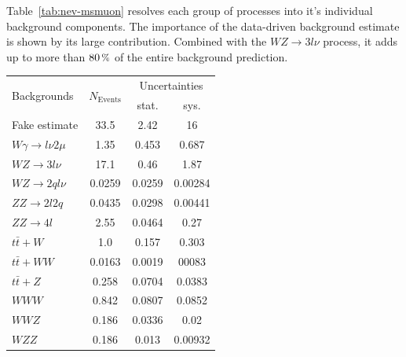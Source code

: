 \noindent Table~\ref{tab:nev-msmuon} resolves each group of processes into it's individual background components. The importance of the data-driven background estimate is shown by its large contribution. Combined with the $WZ \rightarrow 3l \nu$ process, it adds up to more than $80\,\pct$ of the entire background prediction.

\begin{table}[!htb]
  \centering
  \begin{tabular}{|l|c|c|c|}
    \hline
    \multirow{2}{*}{Backgrounds}    & \multirow{2}{*}{$N_{\text{Events}}$} & \multicolumn{2}{|c|}{Uncertainties} \\ \cline{3-4}
                                    &                                      & stat.   & sys.                      \\ \hline \hline
    Fake estimate                   & 33.5                                 & 2.42    & 16                        \\ \hline
    $W\gamma \rightarrow l\nu 2\mu$ & 1.35                                 & 0.453   & 0.687                     \\
    $WZ \rightarrow 3l \nu$         & 17.1                                 & 0.46    & 1.87                      \\
    $WZ \rightarrow 2q l \nu$       & 0.0259                               & 0.0259  & 0.00284                   \\
    $ZZ \rightarrow 2l 2q$          & 0.0435                               & 0.0298  & 0.00441                   \\
    $ZZ \rightarrow 4l$             & 2.55                                 & 0.0464  & 0.27                      \\ \hline
    $t\bar{t} + W$                  & 1.0                                  & 0.157   & 0.303                     \\
    $t\bar{t} + WW$                 & 0.0163                               & 0.0019  & 00083                     \\
    $t\bar{t} + Z$                  & 0.258                                & 0.0704  & 0.0383                    \\ \hline
    $WWW$                           & 0.842                                & 0.0807  & 0.0852                    \\
    $WWZ$                           & 0.186                                & 0.0336  & 0.02                      \\
    $WZZ$                           & 0.186                                & 0.013   & 0.00932                   \\

\end{tabular}
\end{table}
